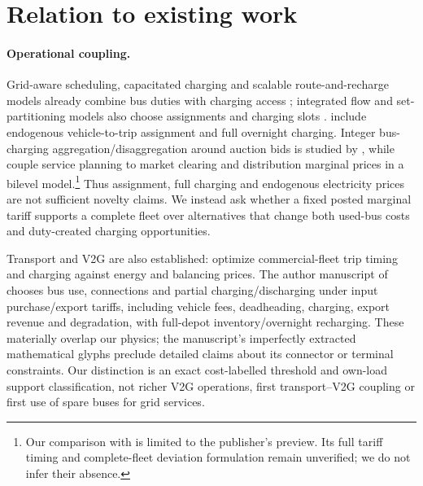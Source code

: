 \section{Relation to existing work}
\paragraph{Operational coupling.}
Grid-aware scheduling, capacitated charging and scalable route-and-recharge
models already combine bus duties with charging access
\citep{wu2022grid,devos2024capacity,parmentier2023fleets}; integrated flow
and set-partitioning models also choose assignments and charging slots
\citep[Sections 2.1 and 4]{borndorfer2024integrated}. \citet{wu2022grid} include endogenous
vehicle-to-trip assignment and full overnight charging. Integer bus-charging
aggregation/disaggregation around auction bids is studied by
\citet{zoltowskaLin2021}, while \citet{wu2019gridinteractive} couple service
planning to market clearing and distribution marginal prices in a bilevel
model.\footnote{Our comparison with \citet{wu2019gridinteractive} is limited
to the publisher's preview. Its full tariff timing and complete-fleet
deviation formulation remain unverified; we do not infer their absence.}
Thus assignment, full charging and endogenous electricity prices are
not sufficient novelty claims. We instead ask whether a fixed posted
marginal tariff supports a complete fleet over alternatives that change
both used-bus costs and duty-created charging opportunities.

Transport and V2G are also established: \citet[Sections 2.1--2.2]{blatiak2022v2g}
optimize commercial-fleet trip timing and charging against energy and
balancing prices. The author manuscript of \citet[Section 2]{zhou2025v2g}
chooses bus use, connections and partial charging/discharging under input
purchase/export tariffs, including vehicle fees, deadheading, charging,
export revenue and degradation, with full-depot inventory/overnight
recharging. These materially overlap
our physics; the manuscript's imperfectly extracted mathematical glyphs
preclude detailed claims about its connector or terminal constraints.
Our distinction is an exact cost-labelled threshold and own-load support
classification, not richer V2G operations, first transport--V2G coupling
or first use of spare buses for grid services.

